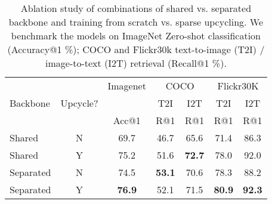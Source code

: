 \begin{table}[t]
\caption{Ablation study of combinations of shared vs. separated backbone and training from scratch vs. sparse upcycling. We benchmark the models on ImageNet Zero-shot classification (Accuracy@1 \%); COCO and Flickr30k text-to-image (T2I) / image-to-text (I2T) retrieval (Recall@1 \%).}
\label{tab:methodology-compare-no-limoe}
\begin{center}
\begin{small}
\begin{sc}
\setlength{\tabcolsep}{1.4 pt}
\begin{tabular}{lc|ccccc}
\toprule
\multirow{3}{*}{Backbone} & \multirow{3}{*}{Upcycle?} & Imagenet &\multicolumn{2}{c}{COCO} &\multicolumn{2}{c}{Flickr30K} \\ 
& & & T2I &I2T &T2I &I2T \\
& & Acc@1 &R@1 &R@1 &R@1 &R@1 \\
\midrule
Shared & N & 69.7 &46.7 &65.6 &71.4 &86.3 \rule{0pt}{3ex} \\
Shared & Y & 75.2 &51.6 &\textbf{72.7} &78.0 &92.0 \rule{0pt}{3ex} \\
Separated & N & 74.5 &\textbf{53.1} &70.6 &78.3 &88.2 \rule{0pt}{3ex} \\
Separated & Y & \textbf{76.9} &52.1 &71.5 &\textbf{80.9} &\textbf{92.3} \rule{0pt}{3ex} \\
\bottomrule
\end{tabular}
\vskip -0.2in
\end{sc}
\end{small}
\end{center}
\end{table}